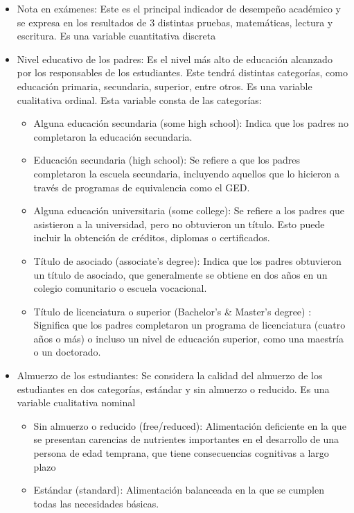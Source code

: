 \documentclass[
]{article}
\providecommand{\tightlist}{%
  \setlength{\itemsep}{0pt}\setlength{\parskip}{0pt}}
\begin{document}
\begin{itemize}
\tightlist
\item
  Nota en exámenes: Este es el principal indicador de desempeño
  académico y se expresa en los resultados de 3 distintas pruebas,
  matemáticas, lectura y escritura. Es una variable cuantitativa
  discreta
\item
  Nivel educativo de los padres: Es el nivel más alto de educación
  alcanzado por los responsables de los estudiantes. Este tendrá
  distintas categorías, como educación primaria, secundaria, superior,
  entre otros. Es una variable cualitativa ordinal. Esta variable consta
  de las categorías:

  \begin{itemize}
  \item
    Alguna educación secundaria (some high school): Indica que los
    padres no completaron la educación secundaria.
  \item
    Educación secundaria (high school): Se refiere a que los padres
    completaron la escuela secundaria, incluyendo aquellos que lo
    hicieron a través de programas de equivalencia como el GED.
  \item
    Alguna educación universitaria (some college): Se refiere a los
    padres que asistieron a la universidad, pero no obtuvieron un
    título. Esto puede incluir la obtención de créditos, diplomas o
    certificados.
  \item
    Título de asociado (associate's degree): Indica que los padres
    obtuvieron un título de asociado, que generalmente se obtiene en dos
    años en un colegio comunitario o escuela vocacional.
  \item
    Título de licenciatura o superior (Bachelor's \& Master's degree) :
    Significa que los padres completaron un programa de licenciatura
    (cuatro años o más) o incluso un nivel de educación superior, como
    una maestría o un doctorado.
  \end{itemize}
\item
  Almuerzo de los estudiantes: Se considera la calidad del almuerzo de
  los estudiantes en dos categorías, estándar y sin almuerzo o reducido.
  Es una variable cualitativa nominal

  \begin{itemize}
  \tightlist
  \item
    Sin almuerzo o reducido (free/reduced): Alimentación deficiente en
    la que se presentan carencias de nutrientes importantes en el
    desarrollo de una persona de edad temprana, que tiene consecuencias
    cognitivas a largo plazo
  \item
    Estándar (standard): Alimentación balanceada en la que se cumplen
    todas las necesidades básicas.
  \end{itemize}
\end{itemize}
\end{document}
